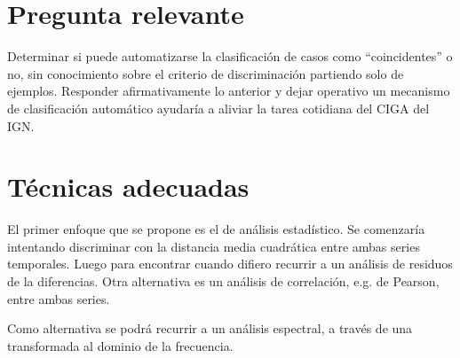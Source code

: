 \documentclass[11pt,spanish,a4paper]{article}
\begin{document}





\section*{Pregunta relevante}
Determinar si puede automatizarse la clasificación de casos como ``coincidentes'' o no, sin conocimiento sobre el criterio de discriminación partiendo solo de ejemplos.
Responder afirmativamente lo anterior y dejar operativo un mecanismo de clasificación automático ayudaría a aliviar la tarea cotidiana del CIGA del IGN.


\section*{Técnicas adecuadas}
El primer enfoque que se propone es el de análisis estadístico.
Se comenzaría intentando discriminar con la distancia media cuadrática entre ambas series temporales.
Luego para encontrar cuando difiero recurrir a un análisis de residuos de la diferencias.
Otra alternativa es un análisis de correlación, e.g. de Pearson, entre ambas series.

Como alternativa se podrá recurrir a un análisis espectral, a través de una transformada al dominio de la frecuencia.



\printbibliography[title= Referencias, heading=bibintoc]
\end{document}
